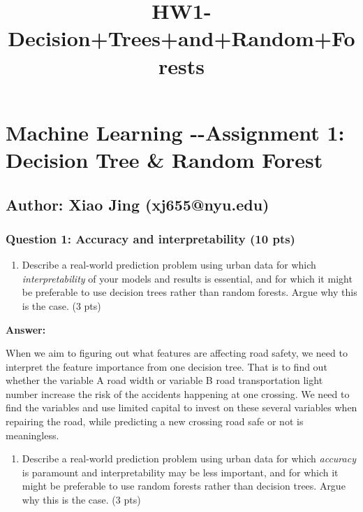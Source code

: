\documentclass[11pt]{article}
\title{HW1-Decision+Trees+and+Random+Forests}
\providecommand{\tightlist}{%
      \setlength{\itemsep}{0pt}\setlength{\parskip}{0pt}}
\begin{document}
    
    
    \maketitle
    
    

    
    \section{Machine Learning -\/-Assignment 1: Decision Tree \& Random
Forest}\label{machine-learning---assignment-1-decision-tree-random-forest}

\subsection{Author: Xiao Jing
(xj655@nyu.edu)}\label{author-xiao-jing-xj655nyu.edu}

    \subsubsection{Question 1: Accuracy and interpretability (10
pts)}\label{question-1-accuracy-and-interpretability-10-pts}

\begin{enumerate}
\def\labelenumi{\alph{enumi})}
\tightlist
\item
  Describe a real-world prediction problem using urban data for which
  \emph{interpretability} of your models and results is essential, and
  for which it might be preferable to use decision trees rather than
  random forests. Argue why this is the case. (3 pts)
\end{enumerate}

    \textbf{Answer:}

When we aim to figuring out what features are affecting road safety, we
need to interpret the feature importance from one decision tree. That is
to find out whether the variable A road width or variable B road
transportation light number increase the risk of the accidents happening
at one crossing. We need to find the variables and use limited capital
to invest on these several variables when repairing the road, while
predicting a new crossing road safe or not is meaningless.

    \begin{enumerate}
\def\labelenumi{\alph{enumi})}
\setcounter{enumi}{1}
\tightlist
\item
  Describe a real-world prediction problem using urban data for which
  \emph{accuracy} is paramount and interpretability may be less
  important, and for which it might be preferable to use random forests
  rather than decision trees. Argue why this is the case. (3 pts)
\end{enumerate}
\end{document}

